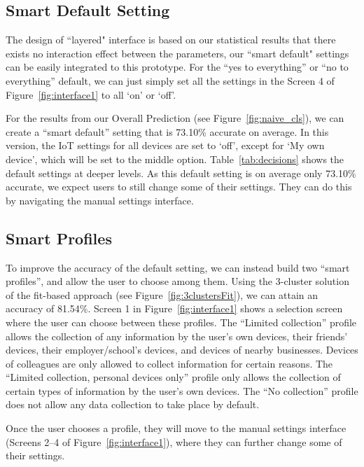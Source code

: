 \subsection{Smart Default Setting}
The design of ``layered" interface is based on our statistical results that there exists no interaction effect between the parameters, our ``smart default" settings can be easily integrated to this prototype. For the ``yes to everything'' or ``no to everything'' default, we can just simply set all the settings in the Screen 4 of Figure~\ref{fig:interface1} to all `on' or `off'.

For the results from our Overall Prediction (see Figure~\ref{fig:naive_cls}), we can create a ``smart default'' setting that is 73.10\% accurate on average. In this version, the IoT settings for all devices are set to `off', except for `My own device', which will be set to the middle option. Table~\ref{tab:decisions} shows the default settings at deeper levels.
As this default setting is on average only 73.10\% accurate, we expect users to still change some of their settings. They can do this by navigating the manual settings interface.

\subsection{Smart Profiles}
To improve the accuracy of the default setting, we can instead build two ``smart profiles'', and allow the user to choose among them. Using the 3-cluster solution of the fit-based approach (see Figure~\ref{fig:3clustersFit}), we can attain an accuracy of 81.54\%. Screen 1 in Figure~\ref{fig:interface1} shows a selection screen where the user can choose between these profiles. The ``Limited collection'' profile allows the collection of any information by the user's own devices, their friends' devices, their employer/school's devices, and devices of nearby businesses. Devices of colleagues are only allowed to collect information for certain reasons. The ``Limited collection, personal devices only'' profile only allows the collection of certain types of information by the user's own devices. The ``No collection'' profile does not allow any data collection to take place by default.

Once the user chooses a profile, they will move to the manual settings interface (Screens 2--4 of Figure~\ref{fig:interface1}), where they can further change some of their settings.

